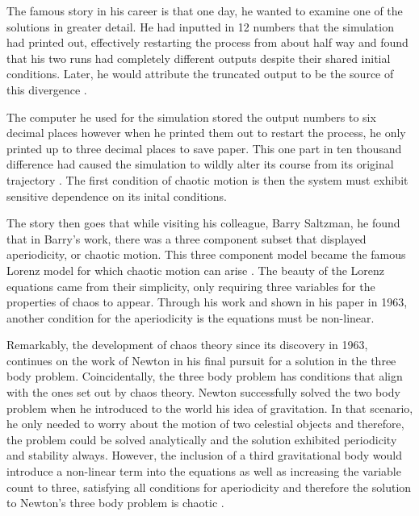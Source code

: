 \documentclass[aps,prl,reprint,10pt,amsmath,amssymb,superscriptaddress,a4paper]{revtex4-2}
\begin{document}
The famous story in his career is that one day, he wanted to examine one of the solutions in greater detail. He had inputted in 
12 numbers that the simulation had printed out, effectively restarting the process from about half way and found that his two runs
had completely different outputs despite their shared initial conditions. Later, he would attribute the truncated output to be the 
source of this divergence \citep{lorenzbio}.

The computer he used for the simulation stored the output numbers to six decimal places however when he printed them out to restart 
the process, he only printed up to three decimal places to save paper. This one part in ten thousand difference had caused 
the simulation to wildly alter its course from its original trajectory \citep{lorenzstory}. The first condition of chaotic motion is 
then the system must exhibit sensitive dependence on its inital conditions. 

The story then goes that while visiting his colleague, Barry Saltzman, he found that in Barry's work, there was a three component subset
that displayed aperiodicity, or chaotic motion. This three component model became the famous Lorenz model for 
which chaotic motion can arise \citep{sparrow}. The beauty of the Lorenz equations came from their simplicity, only requiring three variables
for the properties of chaos to appear. Through his work and shown in his paper in 1963, another condition for the aperiodicity is the 
equations must be non-linear.

Remarkably, the development of chaos theory since its discovery in 1963, continues on the work of Newton in his final pursuit 
for a solution in the three body problem. Coincidentally, the three body problem has conditions 
that align with the ones set out by chaos theory. Newton successfully solved the two body problem when he introduced to the world his idea 
of gravitation. In that scenario, he only needed to worry about the motion of two celestial objects and therefore, the problem could be 
solved analytically and the solution exhibited periodicity and stability always. However, the inclusion of a third gravitational body would 
introduce a non-linear term into the equations as well as increasing the variable count to three, satisfying all conditions for aperiodicity 
and therefore the solution to Newton's three body problem is chaotic \citep{galaviz}.
\end{document}
